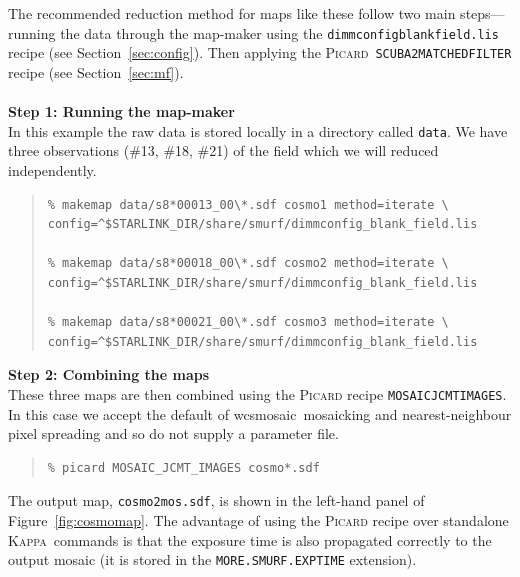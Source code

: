 \documentclass[twoside,11pt]{article}
\newcommand{\htmlref}[2]{#1}
\newcommand{\latexhtml}[2]{#1}
\newcommand{\xref}[3]{#1}
\renewcommand{\_}{\texttt{\symbol{95}}}
\newenvironment{myquote}{\begin{quote}\begin{small}}{\end{small}\end{quote}}
\newcommand{\Kappa}{\xref{\textsc{Kappa}}{sun95}{}}
\newcommand{\picard}{\xref{\textsc{Picard}}{sun265}{}}
\newcommand{\drrecipe}[1]{\texttt{#1}}
\newcommand{\task}[1]{\textsf{#1}}
\newcommand{\wcsmosaic}{\xref{\task{wcsmosaic}}{sun95}{WCSMOSAIC}}
\newcommand{\cref}[3]{\latexhtml{#1~\ref{#2}}{\htmlref{#3}{#2}}}
\begin{document}
The recommended reduction method for maps like these follow two main
steps---running the data through the map-maker using the
\texttt{dimmconfig\_blank\_field.lis} recipe (see
\cref{Section}{sec:config}{Specialised configuration files}). Then
applying the \picard\ \drrecipe{SCUBA2\_MATCHED\_FILTER} recipe (see
\cref{Section}{sec:mf}{Point-source extraction}).
\\ \\
\textbf{Step 1: Running the map-maker}
\vspace{0.2cm}\\
In this example the raw data is stored locally in a directory called
\texttt{data}. We have three observations (\#13, \#18, \#21) of the field
which we will reduced independently.

\begin{myquote}
\begin{verbatim}
% makemap data/s8*00013_00\*.sdf cosmo1 method=iterate \
config=^$STARLINK_DIR/share/smurf/dimmconfig_blank_field.lis

% makemap data/s8*00018_00\*.sdf cosmo2 method=iterate \
config=^$STARLINK_DIR/share/smurf/dimmconfig_blank_field.lis

% makemap data/s8*00021_00\*.sdf cosmo3 method=iterate \
config=^$STARLINK_DIR/share/smurf/dimmconfig_blank_field.lis

\end{verbatim}
\end{myquote}

\textbf{Step 2: Combining the maps}
\vspace{0.2cm}\\
These three maps are then combined using the \textsc{Picard} recipe
\xref{\drrecipe{MOSAIC\_JCMT\_IMAGES}}{sun265}{MOSAIC_JCMT_IMAGES}. In
this case we accept the default of \wcsmosaic\ mosaicking and
nearest-neighbour pixel spreading and so do not supply a parameter
file.
\begin{myquote}
\begin{verbatim}
% picard MOSAIC_JCMT_IMAGES cosmo*.sdf
\end{verbatim}
\end{myquote}
The output map, \texttt{cosmo2\_mos.sdf}, is shown in the left-hand
panel of \cref{Figure}{fig:cosmomap}{the figure below}. The advantage of using the
\textsc{Picard} recipe over standalone \Kappa\ commands is that the exposure
time is also propagated correctly to the output mosaic (it is stored
in the \texttt{MORE.SMURF.EXP\_TIME} extension).
\\
\end{document}
